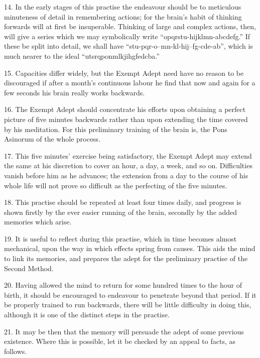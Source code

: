 \begin{sloppypar}
14. In the early stages of this practise the endeavour should be to meticulous minuteness of detail in remembering actions; for the brain’s habit of thinking forwards will at first be insuperable. Thinking of large and complex actions, then, will give a series which we may symbolically write \mbox{\enquote{opqrstu-hijklmn-abcdefg.}} If these be split into detail, we shall have \mbox{\enquote{stu-pqr-o--mn-kl-hij--fg-cde-ab}}, which is much nearer to the ideal \mbox{\enquote{utsrqponmlkjihgfedcba.}}
\end{sloppypar}

15. Capacities differ widely, but the Exempt Adept need have no reason to be discouraged if after a month’s continuous labour he find that now and again for a few seconds his brain really works backwards.

16. The Exempt Adept should concentrate his efforts upon obtaining a perfect picture of five minutes backwards rather than upon extending the time covered by his meditation. For this preliminary training of the brain is, the Pons Asinorum of the whole process. 

17. This five minutes' exercise being satisfactory, the Exempt Adept may extend the same at his discretion to cover an hour, a day, a week, and so on. Difficulties vanish before him as he advances; the extension from a day to the course of his whole life will not prove so difficult as the perfecting of the five minutes.

18. This practise should be repeated at least four times  daily, and progress is shown firstly by the ever easier running of the brain, secondly by the added memories which arise.

19. It is useful to reflect during this practise, which in time becomes almost mechanical, upon the way in which effects spring from causes. This aids the mind to link its memories, and prepares the adept for the preliminary practise of the Second Method.

20. Having allowed the mind to return for some hundred times to the hour of birth, it should be encouraged to endeavour to penetrate beyond that period. If it be properly trained to run backwards, there will be little difficulty in doing this, although it is one of the distinct steps in the practise. 

21. It may be then that the memory will persuade the adept of some previous existence. Where this is possible, let it be checked by an appeal to facts, as follows. 

